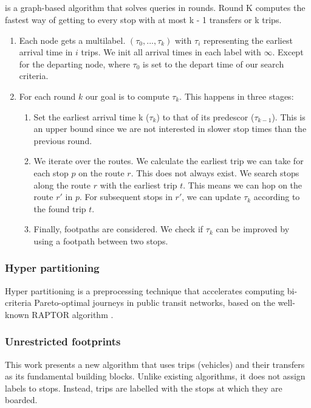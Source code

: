 \subsection{}
 is a graph-based algorithm that solves queries in rounds. Round K computes the fastest way of getting to every stop with at most k - 1 transfers or k trips.

\begin{enumerate}
    \item Each node gets a multilabel. $(\tau_0,...,\tau_k)$ with $\tau_i$ representing the earliest arrival time in $i$ trips. We init all arrival times in each label with $\infty$. Except for the departing node, where $\tau_0$ is set to the depart time of our search criteria.
    \item For each round $k$ our goal is to compute $\tau_k$. This happens in three stages:\begin{enumerate}
        \item Set the earliest arrival time k ($\tau_k$) to that of its predescor ($\tau_{k-1}$). This is an upper bound since we are not interested in slower stop times than the previous round.
        \item We iterate over the routes. We calculate the earliest trip we can take for each stop $p$ on the route $r$. This does not always exist. We search stops along the route $r$ with the earliest trip $t$. This means we can hop on the route $r'$ in $p$. For subsequent stops in $r'$, we can update $\tau_k$ according to the found trip $t$.
        \item Finally, footpaths are considered. We check if $\tau_k$ can be improved by using a footpath between two stops. 
    \end{enumerate}
\end{enumerate}

\subsubsection{Hyper partitioning}
Hyper partitioning is a preprocessing technique that accelerates computing bi-criteria Pareto-optimal journeys in public transit networks, based on the well-known RAPTOR algorithm \cite{delling_round-based_2015}.
\subsubsection{Unrestricted footprints}
This work\cite{baum_ultra_2023} presents a new algorithm that uses trips (vehicles) and their transfers as its fundamental building blocks. Unlike existing algorithms, it does not assign labels to stops. Instead, trips are labelled with the stops at which they are boarded.
